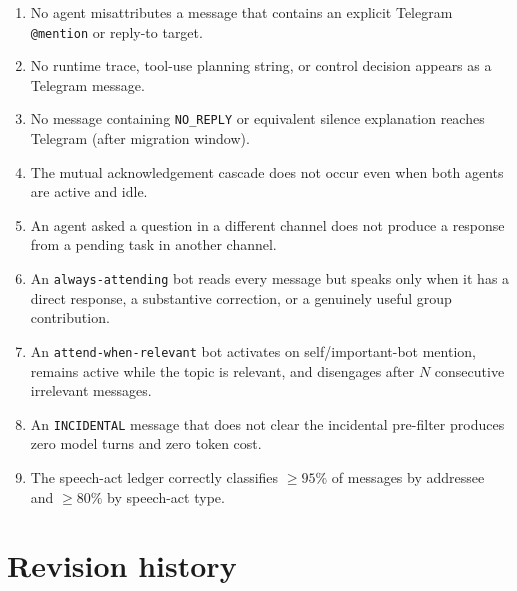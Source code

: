 \documentclass[11pt]{article}
\begin{document}
\begin{enumerate}
\item No agent misattributes a message that contains an explicit Telegram
\texttt{@mention} or reply-to target.
\item No runtime trace, tool-use planning string, or control decision appears
as a Telegram message.
\item No message containing \texttt{NO\_REPLY} or equivalent silence
explanation reaches Telegram (after migration window).
\item The mutual acknowledgement cascade does not occur even when both agents
are active and idle.
\item An agent asked a question in a different channel does not produce a
response from a pending task in another channel.
\item An \texttt{always-attending} bot reads every message but speaks only
when it has a direct response, a substantive correction, or a genuinely
useful group contribution.
\item An \texttt{attend-when-relevant} bot activates on self/important-bot
mention, remains active while the topic is relevant, and disengages after $N$
consecutive irrelevant messages.
\item An \texttt{INCIDENTAL} message that does not clear the incidental
pre-filter produces zero model turns and zero token cost.
\item The speech-act ledger correctly classifies $\geq 95\%$ of messages by
addressee and $\geq 80\%$ by speech-act type.
\end{enumerate}

\section*{Revision history}
\end{document}
